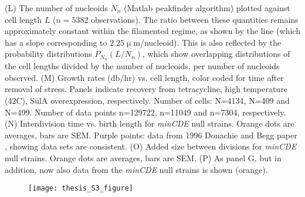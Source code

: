{(L) The number of nucleoids $N_n$ (Matlab peakfinder algorithm) plotted against cell length $L$ ($n = 5382$ observations). The ratio between these quantities remains approximately constant within the filamented regime, as shown by the line (which has a slope corresponding to $2.25 \upmu$m/nucleoid). This is also reflected by the probability distributions $P_{N_n}(L/N_n)$, which show overlapping distributions of the cell lengths divided by the number of nucleoids, per number of nucleoids observed. 
(M) Growth rates (db/hr) vs. cell length, color coded for time after removal of stress. Panels indicate recovery from tetracycline, high temperature (42C), SulA overexpression, respectively. Number of cells: N=4134, N=409 and N=499. Number of data points n=129722, n=11049 and n=7304, respectively. 
(N) Interdivision time vs. birth length for \textit{minCDE} null strains. Orange dots are averages, bars are SEM. Purple points: data from 1996 Donachie and Begg paper \cite{Donachie1996}, showing data sets are consistent.
(O) Added size between divisions for \textit{minCDE} null strains. Orange dots are averages, bars are SEM. 
(P) As panel G, but in addition, now also data from the \textit{minCDE} null strains is shown (orange).}




\begin{figure}
	\centering
	\texttt{[image: thesis\_S3\_figure]}
\end{figure}	
\clearpage
{}



